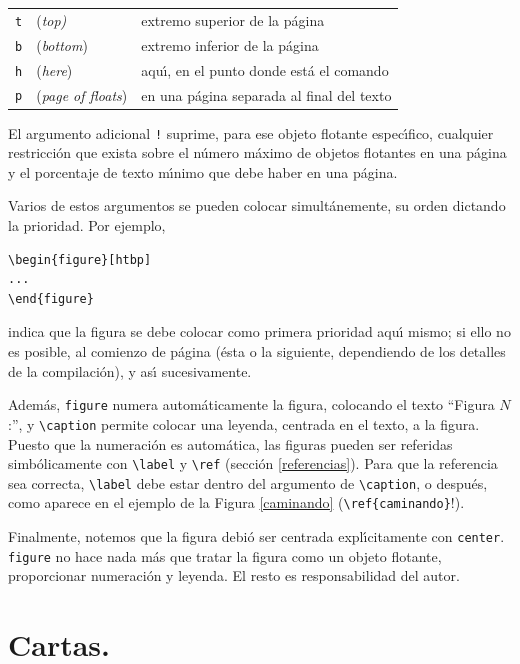 {\vspace{.3cm}
\begin{tabular}{lll}
\verb+t+&({\em top\/)} & extremo superior de la p\'agina \\
\verb+b+&({\em bottom\/}) & extremo inferior de la p\'agina\\
\verb+h+&({\em here\/}) & aqu\'{\i}, en el punto donde est\'a el
comando\\
\verb+p+&({\em page of floats\/}) & en una p\'agina separada al final
del texto
\end{tabular}
\vspace{.3cm}

El argumento adicional \verb+!+ suprime, para ese objeto flotante
espec\'{\i}fico, cualquier restricci\'on que exista sobre el n\'umero
m\'aximo de objetos flotantes en una p\'agina y el porcentaje de texto
m\'{\i}nimo que debe haber en una p\'agina.

Varios de estos argumentos se pueden colocar simult\'anemente, su
orden dictando la prioridad. Por ejemplo, 
\begin{verbatim}
\begin{figure}[htbp]
...
\end{figure}
\end{verbatim}
indica que la figura se debe colocar como primera prioridad aqu\'{\i}
mismo; si ello no es posible, al comienzo de p\'agina (\'esta o la
siguiente, dependiendo de los detalles de la compilaci\'on), y
as\'{\i} sucesivamente.

Adem\'as, \verb+figure+ numera autom\'aticamente la figura, colocando
el texto ``Figura $N$:'', y \verb+\caption+ permite colocar una
leyenda, centrada en el texto, 
a la figura. Puesto que la numeraci\'on es autom\'atica, las figuras
pueden ser referidas simb\'olicamente con \verb+\label+ y \verb+\ref+
(secci\'on \ref{referencias}). Para que la referencia sea correcta,
\verb+\label+ debe estar dentro del argumento de \verb+\caption+, o
despu\'es, como aparece en el ejemplo de la Figura \ref{caminando}
(\verb+\ref{caminando}+!).

Finalmente, notemos que la figura debi\'o ser centrada
expl\'{\i}citamente con \verb+center+. \verb+figure+ no hace nada
m\'as que tratar la figura como un objeto flotante, proporcionar
numeraci\'on y leyenda. El resto es responsabilidad del autor.   


\section{Cartas.}

}

